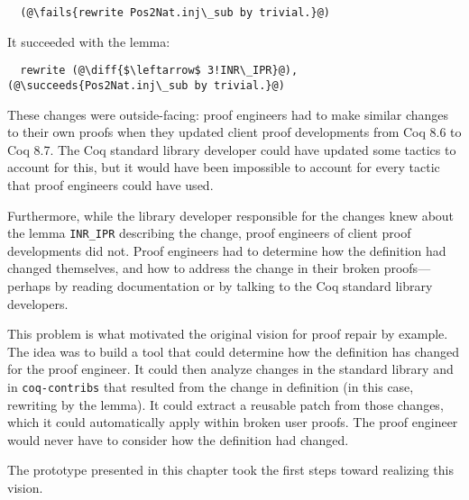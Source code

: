 \begin{lstlisting}
  (@\fails{rewrite Pos2Nat.inj\_sub by trivial.}@)
\end{lstlisting}
It succeeded with the lemma:

\begin{lstlisting}
  rewrite (@\diff{$\leftarrow$ 3!INR\_IPR}@), (@\succeeds{Pos2Nat.inj\_sub by trivial.}@)
\end{lstlisting}
These changes were outside-facing: proof engineers had to make similar changes to their own proofs when
they updated client proof developments from Coq 8.6 to Coq 8.7.
The Coq standard library developer could have updated some tactics to account for this, but it 
would have been impossible to account for every tactic that proof engineers could have used.

Furthermore, while the library developer responsible for the changes knew about the lemma \lstinline{INR_IPR}
describing the change, proof engineers of client proof developments did not. Proof engineers
had to determine how the definition had changed themselves, and how to address the change in their broken proofs---perhaps 
by reading documentation or by talking to the Coq standard library developers. 

This problem is what motivated the original vision for proof repair by example.
The idea was to build a tool that could determine how the definition has changed for the proof engineer.
It could then analyze changes in the standard library and in \lstinline{coq-contribs}
that resulted from the change in definition (in this case, rewriting by the lemma).
It could extract a reusable patch from those changes, which it could automatically apply within broken user proofs. %
The proof engineer would never have to consider how the definition had changed.

The \sysname prototype presented in this chapter took the first steps toward realizing this vision.


